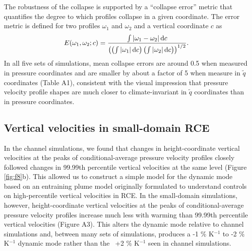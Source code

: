 \documentclass[twocol]{ametsoc}
\begin{document}
The robustness of the collapse is supported by a ``collapse error'' metric that quantifies the degree to which profiles collapse in a given coordinate. The error metric is defined for two profiles $\omega_1$ and $\omega_2$ and a vertical coordinate $c$ as
\begin{equation}
    E(\omega_1, \omega_2; c) = \frac{\int \left | \omega_1 - \omega_2 \right | {\rm d}c}{\left ( \left ( \int \left | \omega_1 \right | {\rm d}c \right ) \left ( \int \left | \omega_2 \right | {\rm d}c \right )\right )^{1/2}}.
\end{equation}
In all five sets of simulations, mean collapse errors are around 0.5 when measured in pressure coordinates and are smaller by about a factor of 5 when measure in $\tilde{q}$ coordinates (Table A1), consistent with the visual impression that pressure velocity profile shapes are much closer to climate-invariant in $\tilde{q}$ coordinates than in pressure coordinates.

\subsection{Vertical velocities in small-domain RCE}
\label{app:small_domain_w}

In the channel simulations, we found that changes in height-coordinate vertical velocities at the peaks of conditional-average pressure velocity profiles closely followed changes in 99.99th percentile vertical velocities at the same level (Figure \ref{fig:f8}b). This allowed us to construct a simple model for the dynamic mode based on an entraining plume model originally formulated to understand controls on high-percentile vertical velocities in RCE. In the small-domain simulations, however, height-coordinate vertical velocities at the peaks of conditional-average pressure velocity profiles increase much less with warming than 99.99th percentile vertical velocities (Figure A3). This alters the dynamic mode relative to channel simulations and, between many sets of simulations, produces a -1 \% K$^{-1}$ to -2 \% K$^{-1}$ dynamic mode rather than the ~+2 \% K$^{-1}$ seen in channel simulations.
\end{document}
